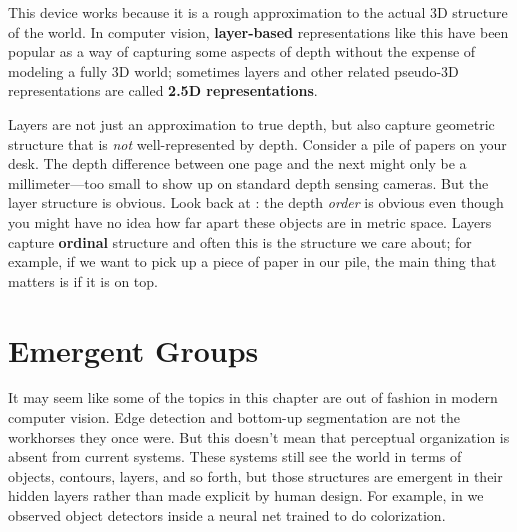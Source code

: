 This device works because it is a rough approximation to the actual 3D structure of the world. In computer vision, \textbf{layer-based} representations like this have been popular as a way of capturing some aspects of depth without the expense of modeling a fully 3D world; sometimes layers and other related pseudo-3D representations are called \textbf{2.5D representations}.

Layers are not just an approximation to true depth, but also capture geometric structure that is \textit{not} well-represented by depth. Consider a pile of papers on your desk. The depth difference between one page and the next might only be a millimeter—too small to show up on standard depth sensing cameras. But the layer structure is obvious. Look back at \fig{\ref{fig:perceptual_organization:perc_org_nonsemantic_example}}: the depth \textit{order} is obvious even though you might have no idea how far apart these objects are in metric space. Layers capture \textbf{ordinal} structure and often this is the structure we care about; for example, if we want to pick up a piece of paper in our pile, the main thing that matters is if it is on top.




\section{Emergent Groups}
It may seem like some of the topics in this chapter are out of fashion in modern computer vision. Edge detection and bottom-up segmentation are not the workhorses they once were. But this doesn't mean that perceptual organization is absent from current systems. These systems still see the world in terms of objects, contours, layers, and so forth, but those structures are emergent in their hidden layers rather than made explicit by human design. For example, in \fig{\ref{fig:representation_learning:obj_detectors_in_colorization}} we observed object detectors inside a neural net trained to do colorization.


